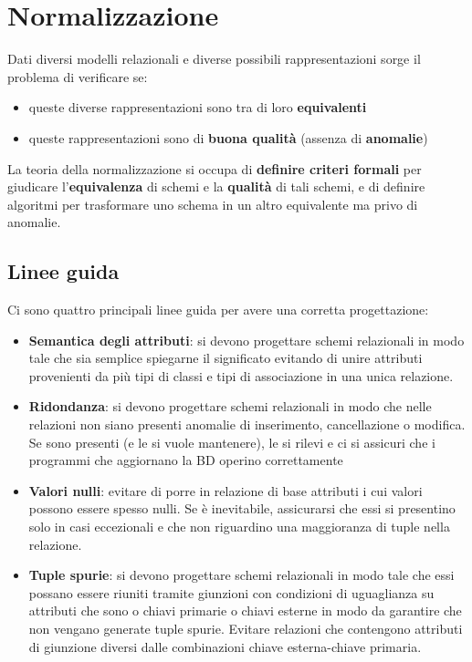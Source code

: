 \newpage
\section{Normalizzazione}
Dati diversi modelli relazionali e diverse possibili rappresentazioni sorge il problema di verificare se:
\begin{itemize}
	\item queste diverse rappresentazioni sono tra di loro \textbf{equivalenti}
	\item queste rappresentazioni sono di \textbf{buona qualità} (assenza di \textbf{anomalie})
\end{itemize}

\begin{definition}
	La teoria della normalizzazione si occupa di \textbf{definire criteri formali} per giudicare l’\textbf{equivalenza} di schemi e la \textbf{qualità} di tali schemi, e di definire algoritmi per trasformare uno schema in un altro equivalente ma privo di anomalie.
\end{definition}

\subsection{Linee guida}
Ci sono quattro principali linee guida per avere una corretta progettazione:
\begin{itemize}
	\item \textbf{Semantica degli attributi}: si devono progettare schemi relazionali in modo tale che sia semplice spiegarne il significato evitando di unire attributi provenienti da più tipi di classi e tipi di associazione in una unica relazione.
	\item \textbf{Ridondanza}: si devono progettare schemi relazionali in modo che nelle relazioni non
	siano presenti anomalie di inserimento, cancellazione o modifica. Se sono presenti (e le si vuole mantenere), le si rilevi e ci si assicuri che i programmi che aggiornano la BD operino correttamente
	\item \textbf{Valori nulli}: evitare di porre in relazione di base attributi i cui valori possono essere spesso nulli. Se è inevitabile, assicurarsi che essi si presentino solo in casi eccezionali e che non riguardino una maggioranza di tuple nella relazione.
	\item \textbf{Tuple spurie}: si devono progettare schemi relazionali in modo tale che essi possano
	essere riuniti tramite giunzioni con condizioni di uguaglianza su attributi	che sono o chiavi primarie o chiavi esterne in modo da garantire che	non vengano generate tuple spurie. Evitare relazioni che contengono attributi di giunzione diversi dalle combinazioni chiave esterna-chiave primaria.
\end{itemize}

